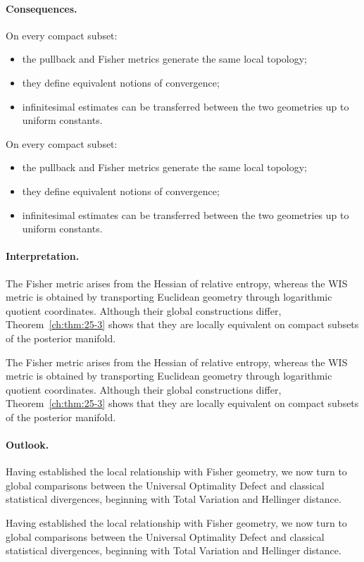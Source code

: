 \paragraph{Consequences.}
\begin{corollary}
\label{ch:cor:25-4}
On every compact subset:
\begin{itemize}
\item the pullback and Fisher metrics generate the same local topology;
\item they define equivalent notions of convergence;
\item infinitesimal estimates can be transferred between the two
    geometries up to uniform constants.
\end{itemize}
\end{corollary}


\begin{corollary}
\label{ch:cor:25-4}
On every compact subset:
\begin{itemize}
\item the pullback and Fisher metrics generate the same local topology;
\item they define equivalent notions of convergence;
\item infinitesimal estimates can be transferred between the two
    geometries up to uniform constants.
\end{itemize}
\end{corollary}
\paragraph{Interpretation.}
The Fisher metric arises from the Hessian of relative entropy, whereas
the WIS metric is obtained by transporting Euclidean geometry through
logarithmic quotient coordinates.
Although their global constructions differ, Theorem~\ref{ch:thm:25-3} shows that they
are locally equivalent on compact subsets of the posterior manifold.


The Fisher metric arises from the Hessian of relative entropy, whereas
the WIS metric is obtained by transporting Euclidean geometry through
logarithmic quotient coordinates.
Although their global constructions differ, Theorem~\ref{ch:thm:25-3} shows that they
are locally equivalent on compact subsets of the posterior manifold.
\paragraph{Outlook.}
Having established the local relationship with Fisher geometry, we now
turn to global comparisons between the Universal Optimality Defect and
classical statistical divergences, beginning with Total Variation and
Hellinger distance.


Having established the local relationship with Fisher geometry, we now
turn to global comparisons between the Universal Optimality Defect and
classical statistical divergences, beginning with Total Variation and
Hellinger distance.
